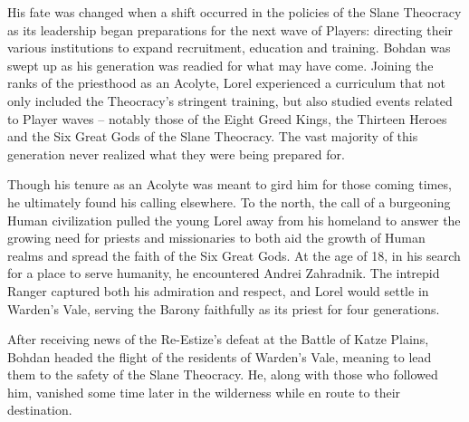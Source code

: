  

His fate was changed when a shift occurred in the policies of the Slane Theocracy as its leadership began preparations for the next wave of Players: directing their various institutions to expand recruitment, education and training. Bohdan was swept up as his generation was readied for what may have come. Joining the ranks of the priesthood as an Acolyte, Lorel experienced a curriculum that not only included the Theocracy’s stringent training, but also studied events related to Player waves – notably those of the Eight Greed Kings, the Thirteen Heroes and the Six Great Gods of the Slane Theocracy. The vast majority of this generation never realized what they were being prepared for.

 

Though his tenure as an Acolyte was meant to gird him for those coming times, he ultimately found his calling elsewhere. To the north, the call of a burgeoning Human civilization pulled the young Lorel away from his homeland to answer the growing need for priests and missionaries to both aid the growth of Human realms and spread the faith of the Six Great Gods. At the age of 18, in his search for a place to serve humanity, he encountered Andrei Zahradnik. The intrepid Ranger captured both his admiration and respect, and Lorel would settle in Warden’s Vale, serving the Barony faithfully as its priest for four generations.

 

After receiving news of the Re-Estize's defeat at the Battle of Katze Plains, Bohdan headed the flight of the residents of Warden’s Vale, meaning to lead them to the safety of the Slane Theocracy. He, along with those who followed him, vanished some time later in the wilderness while en route to their destination.